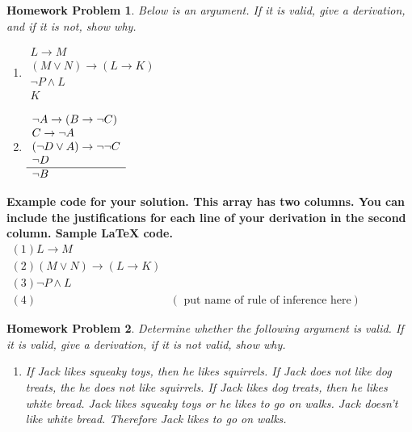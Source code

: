 \documentclass{article}
\newtheorem{hw}{Homework Problem}
\begin{document}
	\begin{hw}
		Below is an argument. If it is valid, give a derivation, and if it is not, show why.
		\begin{enumerate}
			\item
			$
			\begin{array}{l}
				L \rightarrow M  \\
				(M \vee N) \rightarrow (L \rightarrow K)    \\
				\neg P \wedge L\\  \hline
				K
			\end{array}
			$
			\item
			$
			\begin{array}{l}
				\neg A \rightarrow (B \rightarrow \neg C) \\
				C \rightarrow \neg A  \\
				(\neg D \vee A) \rightarrow \neg \neg C \\
				\neg D  \\  \hline
				\neg B
			\end{array}
			\hspace{.2in}
			$
		\end{enumerate}
	\end{hw}
		{\bf Example code for your solution. This array has two columns. You can include the justifications for each line of your derivation in the second column.
	Sample LaTeX code. }
	$
	\begin{array}{ll}
		(1) L \rightarrow M & \\
	(2) (M \vee N) \rightarrow (L \rightarrow K)  &  \\
	(3) \neg P \wedge L & \\  \hline
	(4) & (\textrm{ put name of rule of inference here})
	\end{array}
	$
	\begin{hw}
		Determine whether the following argument is valid. If it is valid, give a derivation, if it is not valid, show why.
		\begin{enumerate}
			\item If Jack likes squeaky toys, then he likes squirrels. If Jack does not like dog treats, the he does not like squirrels. If Jack likes dog treats, then he likes white bread. Jack likes squeaky toys or he likes to go on walks. Jack doesn't like white bread. Therefore Jack likes to go on walks.
		\end{enumerate}
	\end{hw}
\end{document}
